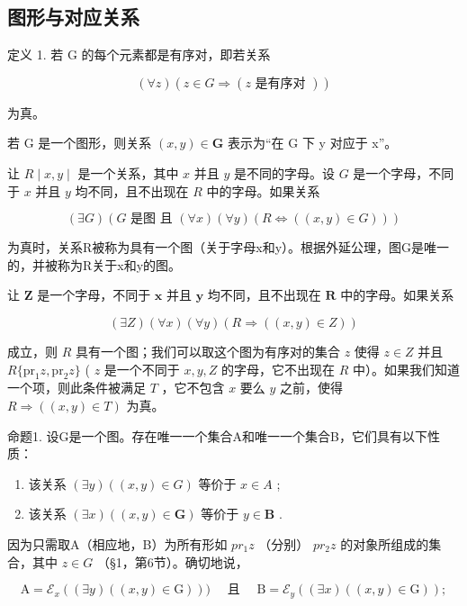 \subsection{图形与对应关系}

定义 1. 若 G 的每个元素都是有序对，即若关系

\[
(\forall z) (z \in G \Longrightarrow (z \text {   是有序对 }))
\]

为真。

若 G 是一个图形，则关系 \((x, y) \in \mathbf{G}\) 表示为“在 G 下 y 对应于 x”。

让 \(R \mid x, y \mid\) 是一个关系，其中 \(x\) 并且 \(y\) 是不同的字母。设 \(G\) 是一个字母，不同于 \(x\) 并且 \(y\) 均不同，且不出现在 \(R\) 中的字母。如果关系

\[
(\exists G) (G \text {   是图   且   } (\forall x) (\forall y) (R \Longleftrightarrow ((x, y) \in G)))
\]

为真时，关系R被称为具有一个图（关于字母x和y）。根据外延公理，图G是唯一的，并被称为R关于x和y的图。

让 \(\pmb{Z}\) 是一个字母，不同于 \(\pmb{x}\) 并且 \(\pmb{y}\) 均不同，且不出现在 \(\pmb{R}\) 中的字母。如果关系

\[
(\exists Z) (\forall x) (\forall y) (R \Longrightarrow ((x, y) \in Z))
\]

成立，则 \(R\) 具有一个图；我们可以取这个图为有序对的集合 \(z\) 使得 \(z \in Z\) 并且 \(R \{ \text{pr}_1 z, \text{pr}_2 z \}\) ( \(z\) 是一个不同于 \(x, y, Z\) 的字母，它不出现在 \(R\) 中）。如果我们知道一个项，则此条件被满足 \(T\) ，它不包含 \(x\) 要么 \(y\) 之前，使得 \(R \Longrightarrow ((x, y) \in T)\) 为真。

命题1. 设G是一个图。存在唯一一个集合A和唯一一个集合B，它们具有以下性质：

\begin{enumerate}
\def\labelenumi{(\arabic{enumi})}
\item
  该关系 \((\exists y)((x, y) \in G)\) 等价于 \(x \in A\) ;
\item
  该关系 \((\exists x)((x, y) \in \mathbf{G})\) 等价于 \(y \in \mathbf{B}\) .
\end{enumerate}

因为只需取A（相应地，B）为所有形如 \(pr_{1}z\) （分别） \(pr_{2}z\) 的对象所组成的集合，其中 \(z \in G\) （§1，第6节）。确切地说，

\[
\mathrm{A} = \mathcal {E} _ {x} ((\exists y) ((x, y) \in \mathrm{G}))) \quad \text { 且 } \quad \mathrm{B} = \mathcal {E} _ {y} ((\exists x) ((x, y) \in \mathrm{G}));
\]

